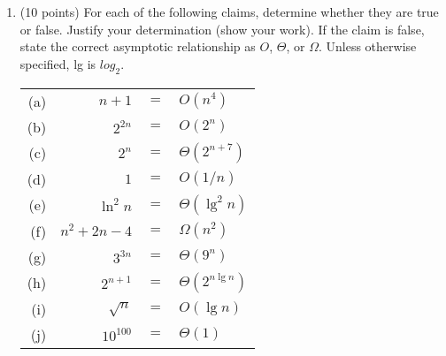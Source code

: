 \documentclass[12pt]{article}
\begin{document}
\renewcommand{\headrulewidth}{0.4pt}


\begin{enumerate}

	\item	(10 points) For each of the following claims, determine whether they are true or false. Justify your determination (show your work). If the claim is false, state the correct asymptotic relationship as $O$, $\Theta$, or $\Omega$. Unless otherwise specified, lg is $log_2$.

	\begin{tabular}{rrcl}
	\vspace{1mm}(a) & $n+1$& $=$ & $O(n^{4})$ \\ %
	\vspace{1mm}(b) & $2^{2n}$& $=$ & $O(2^{n})$  \\ %
	\vspace{1mm}(c) & $2^{n}$& $=$ & $\Theta(2^{n+7})$  \\  %
	\vspace{1mm}(d) & $1$& $=$ & $O(1/n)$   \\ %
	\vspace{1mm}(e) & $\ln^{2}n$& $=$ & $\Theta(\lg^{2}n)$  \\ %
	\vspace{1mm}(f) & $n^{2}+2n-4$& $=$ & $\Omega(n^{2})$ \\ %
	\vspace{1mm}(g) & $3^{3n}$& $=$ & $\Theta(9^{n})$  \\ %
	\vspace{1mm}(h) & $2^{n+1}$& $=$ & $\Theta(2^{n\lg n})$  \\  %
	\vspace{1mm}(i) & $\sqrt{n}$& $=$ & $O(\lg n)$   \\ %
	\vspace{1mm}(j) & $10^{100}$& $=$ & $\Theta(1)$  \\ %
	\end{tabular}

    \pagebreak
    

\end{enumerate}
\end{document}
